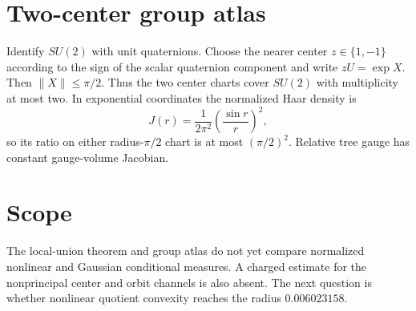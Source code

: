 \documentclass[11pt]{article}
\begin{document}
\section{Two-center group atlas}
Identify $SU(2)$ with unit quaternions.  Choose the nearer center $z\in\{1,-1\}$
according to the sign of the scalar quaternion component and write
$zU=\exp X$.  Then $\|X\|\le\pi/2$.  Thus the two center charts cover $SU(2)$
with multiplicity at most two.  In exponential coordinates the normalized
Haar density is
\[
 J(r)=\frac{1}{2\pi^2}\left(\frac{\sin r}{r}\right)^2,
\]
so its ratio on either radius-$\pi/2$ chart is at most $(\pi/2)^2$.
Relative tree gauge has constant gauge-volume Jacobian.

\section{Scope}
The local-union theorem and group atlas do not yet compare normalized
nonlinear and Gaussian conditional measures.  A charged estimate for the
nonprincipal center and orbit channels is also absent.  The next question is
whether nonlinear quotient convexity reaches the radius $0.006023158$.
\end{document}
